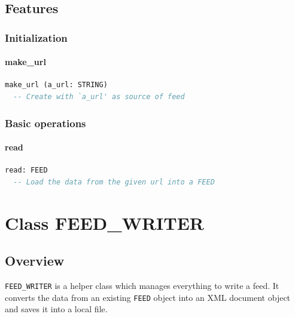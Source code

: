 \section{Features}
\label{sec:feed-reader-features}

\subsection{Initialization}
\label{sec:feed-reader-initialization}

\subsubsection{make\_url}

\begin{lstlisting}[language=Eiffel]
make_url (a_url: STRING)
  -- Create with `a_url' as source of feed
\end{lstlisting}


\subsection{Basic operations}
\label{sec:feed-reader-basic-operations}

\subsubsection{read}

\begin{lstlisting}[language=Eiffel]
read: FEED
  -- Load the data from the given url into a FEED
\end{lstlisting}


\chapter{Class FEED\_WRITER}
\label{cha:feed-writer}

\section{Overview}
\label{sec:feed-writer-overview}

\texttt{FEED\_WRITER} is a helper class which manages everything to
write a feed. It converts the data from an existing \texttt{FEED}
object into an XML document object and saves it into a local file.


